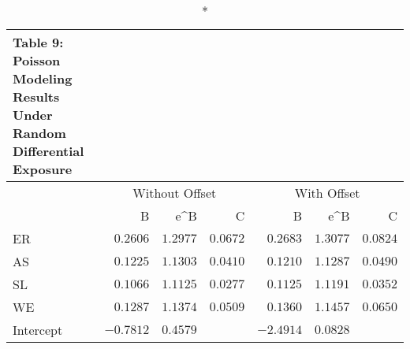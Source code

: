 \begin{longtable}{l|rrrrrr}
\caption*{
{\large Table 9: Poisson Modeling Results Under Random Differential Exposure}
} \\ 
\toprule
\multicolumn{1}{l}{} & \multicolumn{3}{c}{Without Offset} & \multicolumn{3}{c}{With Offset} \\ 
\cmidrule(lr){2-4} \cmidrule(lr){5-7}
\multicolumn{1}{l}{} & B & e\textasciicircum{}B & C & B & e\textasciicircum{}B & C \\ 
\midrule
ER & $0.2606$ & $1.2977$ & $0.0672$ & $0.2683$ & $1.3077$ & $0.0824$ \\ 
AS & $0.1225$ & $1.1303$ & $0.0410$ & $0.1210$ & $1.1287$ & $0.0490$ \\ 
SL & $0.1066$ & $1.1125$ & $0.0277$ & $0.1125$ & $1.1191$ & $0.0352$ \\ 
WE & $0.1287$ & $1.1374$ & $0.0509$ & $0.1360$ & $1.1457$ & $0.0650$ \\ 
Intercept & $-0.7812$ & $0.4579$ &  & $-2.4914$ & $0.0828$ &  \\ 
\bottomrule
\end{longtable}

